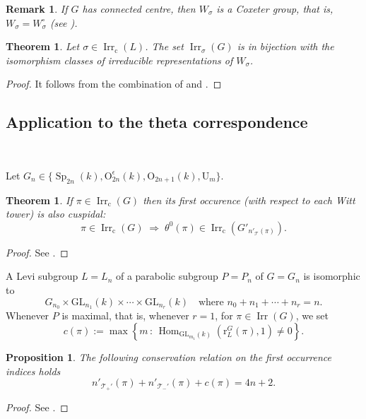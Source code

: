 \documentclass[12pt]{amsart}
\numberwithin{equation}{subsection}
\newtheorem{remark}[equation]{Remark}
\newtheorem{prop}[equation]{Proposition}
\newtheorem{thm}[equation]{Theorem}
\newcommand{\cT}{\mathcal{T}}
\newcommand{\rU}{\mathrm{U}}
\newcommand{\Hom}{\operatorname{Hom}}
\newcommand{\rr}{\operatorname{r}}
\newcommand{\Irr}{\operatorname{Irr}}
\newcommand{\GL}{\mathrm{GL}}
\newcommand{\Sp}{\operatorname{Sp}}
\newcommand{\cc}{\mathrm{c}}
\def\rO{{\mathrm{O}}}
\def\cc{\mathrm{sc}}
\def\rr{{\mathrm{r}}}
\def\cc{{\mathrm{c}}}
\def\cT{{\mathcal{T}}}
\begin{document}
\begin{remark}{\rm If $G$ has connected centre, then $W_{\sigma}$ is a Coxeter group, that is,  $W_{\sigma}=W_{\sigma}^\circ$ (see \cite[Chapter~8]{Lubook}).}
\end{remark}


\begin{thm} \label{thm:HC:W}
Let $\sigma\in\Irr_{\cc}(L)$. 
The set $\Irr_\sigma(G)$ is in bijection with the isomorphism classes of irreducible representations of $W_{\sigma}$.
\end{thm}
\begin{proof}
It follows from the combination of \cite[Theorem 3.1.18]{GMbook} and \cite[Theorem 3.2.5]{GMbook}.
\end{proof}

\subsection{Application to the theta correspondence} \label{subsec:HCT}\

Let $G_n\in\{\Sp_{2n}(k), \rO^\epsilon_{2n}(k), \rO_{2n+1}(k), \rU_m\}$. 

\begin{thm}
If $\pi\in\Irr_\cc(G)$ then its first occurence (with respect to each Witt tower) is also cuspidal:
\[\pi\in\Irr_\cc(G)\;
\Rightarrow\;\theta^0(\pi)\in\Irr_\cc(G'_{n'_{\cT}(\pi)}).\]
\end{thm}
\begin{proof}
See \cite[Th\'eor\`eme.7]{AMR}.
\end{proof}

A Levi subgroup $L=L_n$ of a parabolic subgroup $P=P_n$ of $G=G_n$ is isomorphic to 
\begin{equation} \label{eqn:Levi}
G_{n_0}\times \GL_{n_1}(k)\times\cdots\times\GL_{n_r}(k)\quad\text{where $n_0+n_1+\cdots+n_r=n$.}
\end{equation}
Whenever $P$ is maximal, that is, whenever $r=1$, for $\pi\in\Irr(G)$, we set
\begin{equation}
c(\pi):=\max\left\{m\,:\,\Hom_{\GL_{m_1}(k)}(\rr^G_{L}(\pi),1)\ne 0\right\}.
\end{equation}

\begin{prop} The following \textit{conservation relation}  on the first occurrence indices holds
\[n'_{\cT_+'}(\pi)+n'_{\cT_-'}(\pi)+c(\pi)=4n+2.\]
\end{prop}
\begin{proof}
See \cite[Proposition 3.7]{MQZ}.
\end{proof}
\end{document}
